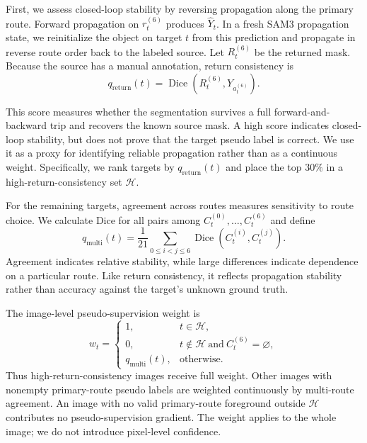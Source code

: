 \documentclass[a4paper,fleqn]{cas-dc}
\begin{document}
First, we assess closed-loop stability by reversing propagation along the primary route. Forward propagation on $r_t^{(6)}$ produces $\widehat{Y}_t$. In a fresh SAM3 propagation state, we reinitialize the object on target $t$ from this prediction and propagate in reverse route order back to the labeled source. Let $R_t^{(6)}$ be the returned mask. Because the source has a manual annotation, return consistency is
\begin{equation}
q_{\mathrm{return}}(t)=
\operatorname{Dice}\left(
R_t^{(6)},Y_{a_t^{(6)}}
\right).
\end{equation}

This score measures whether the segmentation survives a full forward-and-backward trip and recovers the known source mask. A high score indicates closed-loop stability, but does not prove that the target pseudo label is correct. We use it as a proxy for identifying reliable propagation rather than as a continuous weight. Specifically, we rank targets by $q_{\mathrm{return}}(t)$ and place the top $30\%$ in a high-return-consistency set $\mathcal{H}$.

For the remaining targets, agreement across routes measures sensitivity to route choice. We calculate Dice for all pairs among $C_t^{(0)},\ldots,C_t^{(6)}$ and define
\begin{equation}
q_{\mathrm{multi}}(t)=
\frac{1}{21}\sum_{0\le i<j\le6}
\operatorname{Dice}\left(C_t^{(i)},C_t^{(j)}\right).
\end{equation}
Agreement indicates relative stability, while large differences indicate dependence on a particular route. Like return consistency, it reflects propagation stability rather than accuracy against the target's unknown ground truth.

The image-level pseudo-supervision weight is
\begin{equation}
w_t=
\begin{cases}
1,&t\in\mathcal{H},\\[4pt]
0,&t\notin\mathcal{H}\ \text{and}\ C_t^{(6)}=\varnothing,\\[4pt]
q_{\mathrm{multi}}(t),&\text{otherwise}.
\end{cases}
\end{equation}
Thus high-return-consistency images receive full weight. Other images with nonempty primary-route pseudo labels are weighted continuously by multi-route agreement. An image with no valid primary-route foreground outside $\mathcal{H}$ contributes no pseudo-supervision gradient. The weight applies to the whole image; we do not introduce pixel-level confidence.
\end{document}
